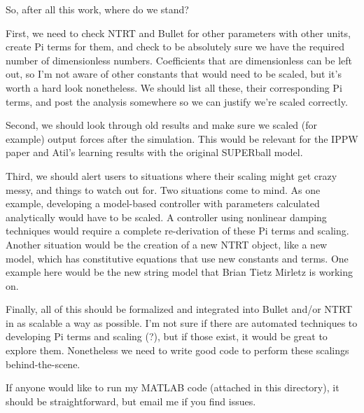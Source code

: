 \documentclass[12pt,letterpaper]{article}
\begin{document}
So, after all this work, where do we stand? 

First, we need to check NTRT and Bullet for other parameters with other units, create Pi terms for them, and check to be absolutely sure we have the required number of dimensionless numbers.
Coefficients that are dimensionless can be left out, so I'm not aware of other constants that would need to be scaled, but it's worth a hard look nonetheless.
We should list all these, their corresponding Pi terms, and post the analysis somewhere so we can justify we're scaled correctly.

Second, we should look through old results and make sure we scaled (for example) output forces after the simulation.
This would be relevant for the IPPW paper and Atil's learning results with the original SUPERball model.

Third, we should alert users to situations where their scaling might get crazy messy, and things to watch out for.
Two situations come to mind.
As one example, developing a model-based controller with parameters calculated analytically would have to be scaled. A controller using nonlinear damping techniques would require a complete re-derivation of these Pi terms and scaling.
Another situation would be the creation of a new NTRT object, like a new model, which has constitutive equations that use new constants and terms.
One example here would be the new string model that Brian Tietz Mirletz is working on.

Finally, all of this should be formalized and integrated into Bullet and/or NTRT in as scalable a way as possible.
I'm not sure if there are automated techniques to developing Pi terms and scaling (?), but if those exist, it would be great to explore them.
Nonetheless we need to write good code to perform these scalings behind-the-scene.

If anyone would like to run my MATLAB code (attached in this directory), it should be straightforward, but email me if you find issues.
\end{document}
